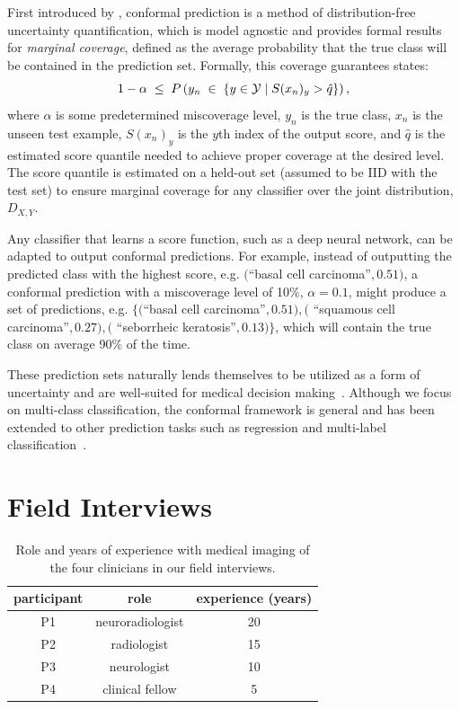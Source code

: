 \documentclass[letterpaper]{article} %
\begin{document}
First introduced by \citet{vovk}, conformal prediction is a method of distribution-free uncertainty quantification, which is model agnostic and provides formal results for \textit{marginal coverage}, defined as the average probability that the true class will be contained in the prediction set.
Formally, this coverage guarantees states:
\begin{equation}
\small
1 - \alpha \; \leq \; P\left(y_n \; \in \; \left\{y \in \mathcal{Y} \mid S(x_n)_y > \hat{q} \right\} \right),
\end{equation}
where $\alpha$ is some predetermined miscoverage level, $y_n$ is the true class, $x_n$ is the unseen test example, $S(x_n)_y$ is the $y$th index of the output score, and $\hat{q}$ is the estimated score quantile needed to achieve proper coverage at the desired level.
The score quantile is estimated on a held-out set (assumed to be IID with the test set) to ensure marginal coverage for any classifier over the joint distribution, $D_{X, Y}$.


Any classifier that learns a score function, such as a deep neural network, can be adapted to output conformal predictions.
For example, instead of outputting the predicted class with the highest score, e.g. $($``basal cell carcinoma''$, 0.51)$, a conformal prediction with a miscoverage level of 10\%, $\alpha=0.1$, might produce a set of predictions, e.g. $\{($``basal cell carcinoma''$, 0.51), ($ ``squamous cell carcinoma''$, 0.27), ($ ``seborrheic keratosis''$, 0.13)\}$, which will contain the true class on average 90\% of the time.

These prediction sets naturally lends themselves to be utilized as a form of uncertainty and are well-suited for medical decision making~\cite{kompa,10.1007/s41666-021-00113-8}.
Although we focus on multi-class classification, the conformal framework is general and has been extended to other prediction tasks such as regression and multi-label classification~\cite{NEURIPS2019_5103c358,JMLR:v22:20-753}.


\section{Field Interviews}
\begin{table}[t]
\small
\centering
\begin{tabular}{ccc}
\toprule
\textbf{participant} & \textbf{role} & \textbf{experience (years)} \\
\midrule
P1 & neuroradiologist & 20 \\
P2 & radiologist & 15 \\
P3 & neurologist & 10 \\
P4 & clinical fellow & 5 \\
\bottomrule
\end{tabular}
\caption{Role and years of experience with medical imaging of the four clinicians in our field interviews.}
\label{tab:field}
\end{table}
\end{document}

